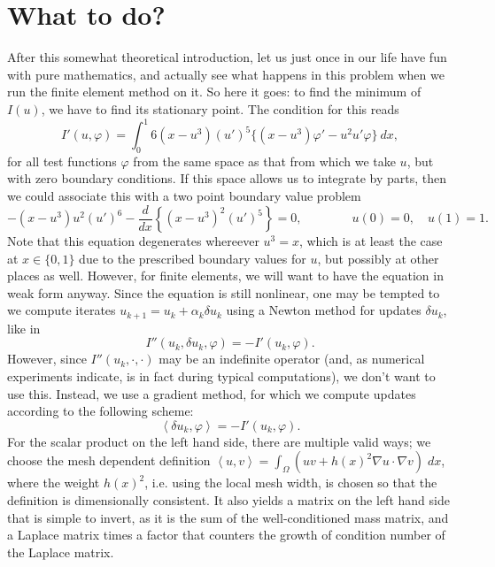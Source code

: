 \documentclass{article}
\begin{document}
\section{What to do?}

After this somewhat theoretical introduction, let us just once in our life
have fun with pure mathematics, and actually see what happens in this problem
when we run the finite element method on it. So here it goes: to find the
minimum of $I(u)$, we have to find its stationary point. The condition for
this reads
\begin{equation*}
  I'(u,\varphi) 
  = 
  \int_0^1 6 (x-u^3) (u')^5 \{ (x-u^3)\varphi' - u^2 u' \varphi\}\ dx,
\end{equation*}
for all test functions $\varphi$ from the same space as that from which we
take $u$, but with zero boundary conditions. If this space allows us to
integrate by parts, then we could associate this with a two point boundary
value problem
\begin{equation}
  \label{eq:equation}
  -(x-u^3) u^2(u')^6
  - \frac{d}{dx} \left\{(x-u^3)^2 (u')^5\right\} = 0,
  \qquad\qquad u(0)=0,
  \quad u(1)=1.
\end{equation}
Note that this equation degenerates whereever $u^3=x$, which is at least the
case at $x\in\{0,1\}$ due to the prescribed boundary values for $u$, but
possibly at other places as well.  However, for finite elements, we will want
to have the equation in weak form anyway.  Since the equation is still
nonlinear, one may be tempted to we compute iterates
$u_{k+1}=u_k+\alpha_k\delta u_k$ using a Newton method for updates $\delta
u_k$, like in
\begin{equation*}
  I''(u_k,\delta u_k,\varphi) 
  = 
  -I'(u_k, \varphi).
\end{equation*}
However, since $I''(u_k,\cdot,\cdot)$ may be an indefinite operator (and, as
numerical experiments indicate, is in fact during typical computations), we
don't want to use this. Instead, we use a gradient method, for which we
compute updates according to the following scheme:
\begin{equation}
  \left<\delta u_k,\varphi\right>
  = 
  -I'(u_k, \varphi).
\end{equation}
For the scalar product on the left hand side, there are multiple valid ways;
we choose the mesh dependent definition $\left<u,v\right> = \int_\Omega (uv +
h(x)^2 \nabla u\cdot \nabla v)\; dx$, where the weight $h(x)^2$, i.e. using
the local mesh width, is chosen so that the definition is dimensionally
consistent. It also yields a matrix on the left hand side that is simple to
invert, as it is the sum of the well-conditioned mass matrix, and a Laplace
matrix times a factor that counters the growth of condition number of the
Laplace matrix.
\end{document}
